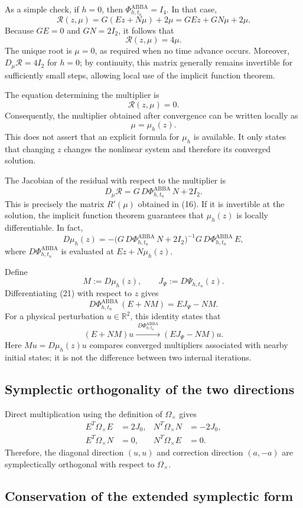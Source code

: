 \documentclass[11pt,a4paper]{article}
\newcommand{\R}{\mathbb{R}}
\newcommand{\Id}{I}
\newcommand{\Om}{\Omega_{\times}}
\newcommand{\PhiAB}{\Phi^{\mathrm{ABBA}}_{h,t_n}}
\begin{document}
As a simple check, if $h=0$, then $\PhiAB=\Id_4$. In that case,
\[
 \mathcal R(z,\mu)
 =G(Ez+N\mu)+2\mu
 =GEz+GN\mu+2\mu.
\]
Because $GE=0$ and $GN=2\Id_2$, it follows that
\[
 \mathcal R(z,\mu)=4\mu.
\]
The unique root is $\mu=0$, as required when no time advance occurs. Moreover,
$D_\mu\mathcal R=4\Id_2$ for $h=0$; by continuity, this matrix generally remains
invertible for sufficiently small steps, allowing local use of the implicit function theorem.

The equation determining the multiplier is
\[
 \mathcal R(z,\mu)=0.
\]
Consequently, the multiplier obtained after convergence can be written locally as
\[
 \mu=\mu_h(z).
\]
This does not assert that an explicit formula for $\mu_h$ is available. It only states that
changing $z$ changes the nonlinear system and therefore its converged solution.

The Jacobian of the residual with respect to the multiplier is
\[
 D_\mu\mathcal R
 =G\,D\PhiAB\,N+2\Id_2. \tag{23}
\]
This is precisely the matrix $R'(\mu)$ obtained in (16). If it is invertible at the solution,
the implicit function theorem guarantees that $\mu_h(z)$ is locally differentiable.
In fact,
\[
 D\mu_h(z)
 =-\bigl(G\,D\PhiAB\,N+2\Id_2\bigr)^{-1}
   G\,D\PhiAB\,E,
\]
where $D\PhiAB$ is evaluated at $Ez+N\mu_h(z)$.

Define
\[
 M:=D\mu_h(z),
 \qquad
 J_\Psi:=D\Psi_{h,t_n}(z).
\]
Differentiating (21) with respect to $z$ gives
\[
 \boxed{
 D\PhiAB\,(E+NM)=EJ_\Psi-NM.
 } \tag{24}
\]
For a physical perturbation $u\in\R^2$, this identity states that
\[
 (E+NM)u
 \xrightarrow{\;D\PhiAB\;}
 (EJ_\Psi-NM)u.
\]
Here $Mu=D\mu_h(z)u$ compares converged multipliers associated with nearby initial states;
it is not the difference between two internal iterations.

\subsection{Symplectic orthogonality of the two directions}

Direct multiplication using the definition of $\Om$ gives
\[
 \boxed{
 \begin{aligned}
 E^T\Om E&=2J_0,
 &N^T\Om N&=-2J_0,\\
 E^T\Om N&=0,
 &N^T\Om E&=0.
 \end{aligned}
 } \tag{25}
\]
Therefore, the diagonal direction $(u,u)$ and correction direction $(a,-a)$ are
symplectically orthogonal with respect to $\Om$.

\subsection{Conservation of the extended symplectic form}
\end{document}
